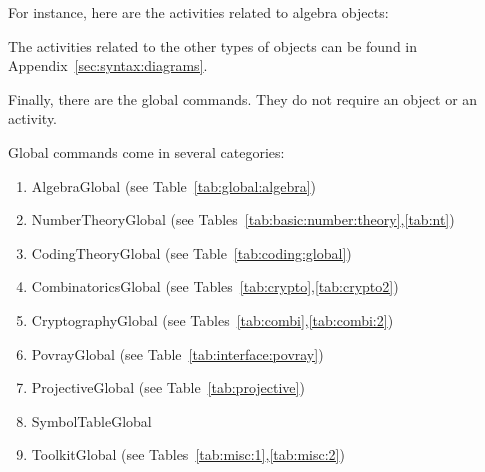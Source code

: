 For instance, here are the activities related to algebra objects:



The activities related to the other types of objects can be found in Appendix~\ref{sec:syntax:diagrams}.










\bigskip



Finally, there are the global commands. 
They do not require an object or an activity. 


Global commands come in several categories:

\begin{enumerate}
\item
AlgebraGlobal  (see Table~\ref{tab:global:algebra})
\item
NumberTheoryGlobal  (see Tables~\ref{tab:basic:number:theory},\ref{tab:nt})
\item
CodingTheoryGlobal (see Table~\ref{tab:coding:global})
\item
CombinatoricsGlobal (see Tables~\ref{tab:crypto},\ref{tab:crypto2})
\item
CryptographyGlobal (see Tables~\ref{tab:combi},\ref{tab:combi:2})
\item
PovrayGlobal  (see Table~\ref{tab:interface:povray})
\item
ProjectiveGlobal (see Table~\ref{tab:projective})
\item
SymbolTableGlobal
\item
ToolkitGlobal  (see Tables~\ref{tab:misc:1},\ref{tab:misc:2})
\end{enumerate}



\bigskip







